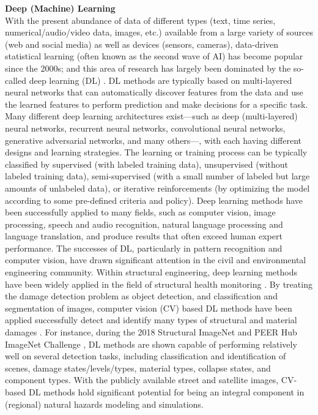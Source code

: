 \noindent\textbf{Deep (Machine) Learning} \\With the present abundance of data of different types (text, time series, numerical/audio/video data, images, etc.) available from a large variety of sources (web and social media) as well as devices (sensors, cameras), data-driven statistical learning (often known as the second wave of AI) has become popular since the 2000s; and this area of research has largely been dominated by the so-called deep learning (DL) \citep{lecun2015deep}. DL methods are typically based on multi-layered neural networks that can automatically discover features from the data and use the learned features to perform prediction and make decisions for a specific task. Many different deep learning architectures exist—such as deep (multi-layered) neural networks, recurrent neural networks, convolutional neural networks, generative adversarial networks, and many others—, with each having different designs and learning strategies. The learning or training process can be typically classified by supervised (with labeled training data), unsupervised (without labeled training data), semi-supervised (with a small number of labeled but large amounts of unlabeled data), or iterative reinforcements (by optimizing the model according to some pre-defined criteria and policy). Deep learning methods have been successfully applied to many fields, such as computer vision, image processing, speech and audio recognition, natural language processing and language translation, and produce results that often exceed human expert performance. The successes of DL, particularly in pattern recognition and computer vision, have drawn significant attention in the civil and environmental engineering community. Within structural engineering, deep learning methods have been widely applied in the field of structural health monitoring \citep{salehia2018emerging}. By treating the damage detection problem as object detection, and classification and segmentation of images, computer vision (CV) based DL methods have been applied successfully detect and identify many types of structural and material damages \citep{cha2017deep,ferguson2018detection,gao2018deep,yeum2019automated,lenjani2020automated}. For instance, during the 2018 Structural ImageNet and PEER Hub ImageNet Challenge \citep{gao2018structural}, DL methods are shown capable of performing relatively well on several detection tasks, including classification and identification of scenes, damage states/levels/types, material types, collapse states, and component types. With the publicly available street and satellite images, CV-based DL methods hold significant potential for being an integral component in (regional) natural hazards modeling and simulations.

